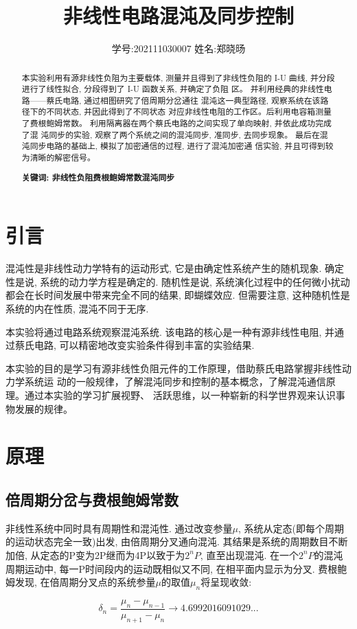 \documentclass[12pt,a4paper]{article}
\title{\vspace{-4cm}\Large 非线性电路混沌及同步控制}  %
\author{\kaishu 学号:202111030007 \hspace{2cm} 姓名:郑晓旸}   %
\date{}
\newcommand{\be}[1]{
    \begin{equation}
        #1
    \end{equation}
}
\begin{document}
\maketitle

\begin{abstract}
    本实验利用有源非线性负阻为主要载体, 测量并且得到了非线性负阻的
I-U 曲线, 并分段进行了线性拟合, 分段得到了 I-U 函数关系, 并确定了负阻
区。
并利用经典的非线性电路——蔡氏电路, 通过相图研究了倍周期分岔通往
混沌这一典型路径, 观察系统在该路径下的不同状态, 并因此得到了不同状态
对应非线性电阻的工作区。后利用电容箱测量了费根鲍姆常数。
利用隔离器在两个蔡氏电路的之间实现了单向映射, 并依此成功完成了混
沌同步的实验, 观察了两个系统之间的混沌同步, 准同步, 去同步现象。
最后在混沌同步电路的基础上, 模拟了加密通信的过程, 进行了混沌加密通
信实验, 并且可得到较为清晰的解密信号。

\bf{关键词: 非线性负阻\quad 费根鲍姆常数\quad 混沌同步}
\end{abstract}

\section{引言}
混沌性是非线性动力学特有的运动形式, 它是由确定性系统产生的随机现象. 确定性是说, 系统的动力学方程是确定的. 随机性是说, 系统演化过程中的任何微小扰动都会在长时间发展中带来完全不同的结果, 
即蝴蝶效应. 但需要注意, 这种随机性是系统的内在性质, 混沌不同于无序. 

本实验将通过电路系统观察混沌系统. 该电路的核心是一种有源非线性电阻, 并通过蔡氏电路, 可以精密地改变实验条件得到丰富的实验结果. 

本实验的目的是学习有源非线性负阻元件的工作原理，借助蔡氏电路掌握非线性动力学系统运
动的一般规律，了解混沌同步和控制的基本概念，了解混沌通信原理。通过本实验的学习扩展视野、
活跃思维，以一种崭新的科学世界观来认识事物发展的规律。

\section{原理}
\subsection{倍周期分岔与费根鲍姆常数}
非线性系统中同时具有周期性和混沌性. 通过改变参量$\mu$, 系统从定态(即每个周期的运动状态完全一致)出发, 由倍周期分叉通向混沌. 其结果是系统的周期数目不断加倍, 从定态的P变为2P继而为4P以致于为$2^n P$, 直至出现混沌. 在一个$2^n P$的混沌周期运动中, 每一P时间段内的运动既相似又不同, 在相平面内显示为分叉. 费根鲍姆发现, 
在倍周期分叉点的系统参量$\mu$的取值$\mu_{n}$将呈现收敛: 
\be{\delta_{n}=\frac{\mu_{n}-\mu_{n-1}}{\mu_{n+1}-\mu_{n}}\rightarrow 4.6992016091029...}
\end{document}
